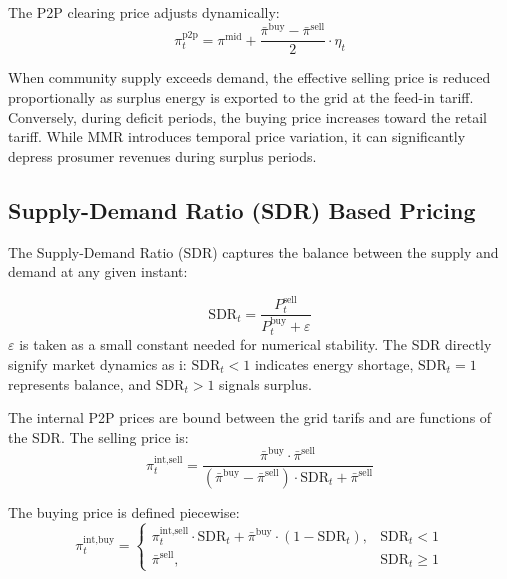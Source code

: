 \documentclass[conference]{IEEEtran}
\begin{document}
The P2P clearing price adjusts dynamically:
\begin{equation}
    \pi_t^{\text{p2p}} = \pi^{\text{mid}} + \frac{\bar{\pi}^{\text{buy}} - \bar{\pi}^{\text{sell}}}{2} \cdot \eta_t
    \label{eq:mmr_price}
\end{equation}

When community supply exceeds demand, the effective selling price is reduced proportionally as surplus energy is exported to the grid at the feed-in tariff. Conversely, during deficit periods, the buying price increases toward the retail tariff. While MMR introduces temporal price variation, it can significantly depress prosumer revenues during surplus periods.

\subsection{Supply-Demand Ratio (SDR) Based Pricing}
The Supply-Demand Ratio (SDR) captures the balance between the supply and demand at any given instant:

\begin{equation}
    \text{SDR}_t = \frac{P_t^{\text{sell}}}{P_t^{\text{buy}} + \varepsilon}
    \label{eq:sdr}
\end{equation}
 $\varepsilon$ is taken as a small constant needed for numerical stability. The SDR directly signify market dynamics as i: $\text{SDR}_t < 1$ indicates energy shortage, $\text{SDR}_t = 1$ represents balance, and $\text{SDR}_t > 1$ signals surplus.

The internal P2P prices are bound between the grid tarifs and are functions of the SDR. The selling price is:
\begin{equation}
    \pi_t^{\text{int,sell}} = \frac{\bar{\pi}^{\text{buy}} \cdot \bar{\pi}^{\text{sell}}}{(\bar{\pi}^{\text{buy}} - \bar{\pi}^{\text{sell}}) \cdot \text{SDR}_t + \bar{\pi}^{\text{sell}}}
    \label{eq:sdr_sell}
\end{equation}

The buying price is defined piecewise:
\begin{equation}
    \pi_t^{\text{int,buy}} = \begin{cases}
        \pi_t^{\text{int,sell}} \cdot \text{SDR}_t + \bar{\pi}^{\text{buy}} \cdot (1 - \text{SDR}_t), & \text{SDR}_t < 1 \\
        \bar{\pi}^{\text{sell}}, & \text{SDR}_t \geq 1
    \end{cases}
    \label{eq:sdr_buy}
\end{equation}
\end{document}
